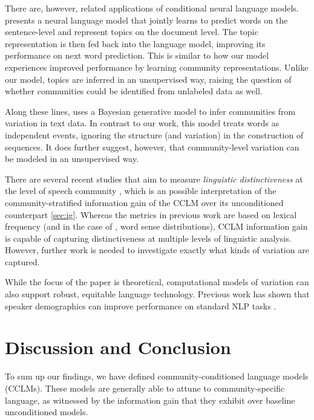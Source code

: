 \documentclass[11pt]{article}
\begin{document}
There are, however, related applications of conditional neural language models.
\citet{Lau2017a} presents a neural language model that jointly learns to predict
words on the sentence-level and represent topics on the document level.
The topic representation is then fed back into the language model, 
improving its performance on next word prediction.
This is similar to how our model experiences improved performance
by learning community representations. 
Unlike our model, topics are inferred in an unsupervised way, 
raising the question of whether communities could be identified from 
unlabeled data as well.

Along these lines, \citet{OConnor2010} uses a Bayesian generative
model to infer communities from variation in text data.  In contrast
to our work, this model treats words as independent events, ignoring
the structure (and variation) in the construction of sequences.  It
does further suggest, however, that community-level variation can be
modeled in an unsupervised way.

There are several recent studies that aim to measure \emph{linguistic distinctiveness}
at the level of speech community \citep{OConnor2010,Zhang2018,Lucy2021}, 
which is an possible interpretation of the community-stratified information gain 
of the CCLM over its unconditioned counterpart \cref{sec:ig}. 
Whereas the metrics in previous work are based on lexical frequency
(and in the case of \citet{Lucy2021}, word sense distributions),
CCLM information gain is capable of capturing 
distinctiveness at multiple levels of linguistic analysis. 
However, further work is needed to
investigate exactly what kinds of variation are captured.

While the focus of the paper is theoretical,
computational models of variation can also support 
robust, equitable language technology.  Previous work has shown that
speaker demographics can improve performance on standard NLP tasks
\citep{Hovy2015,Yang2017}. %


\section{Discussion and Conclusion}\label{sec:discussion-conclusion}


To sum up our findings, we have defined community-conditioned language
models (CCLMs). These models are generally able to attune to
community-specific language, as witnessed by the information gain that
they exhibit over baseline unconditioned models.
\end{document}
